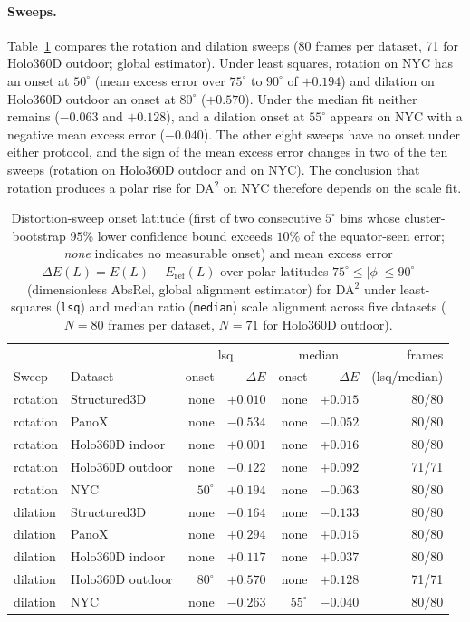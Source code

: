 \documentclass{article}
\newcommand{\absrel}{AbsRel}
\begin{document}
\paragraph{Sweeps.} Table~\ref{tab:da2sweep} compares the rotation and dilation sweeps (80 frames per dataset, 71 for Holo360D outdoor; global estimator). Under least squares, rotation on NYC has an onset at $50^\circ$ (mean excess error over $75^\circ$ to $90^\circ$ of $+0.194$) and dilation on Holo360D outdoor an onset at $80^\circ$ ($+0.570$). Under the median fit neither remains ($-0.063$ and $+0.128$), and a dilation onset at $55^\circ$ appears on NYC with a negative mean excess error ($-0.040$). The other eight sweeps have no onset under either protocol, and the sign of the mean excess error changes in two of the ten sweeps (rotation on Holo360D outdoor and on NYC). The conclusion that rotation produces a polar rise for DA$^2$ on NYC therefore depends on the scale fit.

\begin{table}[htbp]\centering\footnotesize
\caption{Distortion-sweep onset latitude (first of two consecutive $5^\circ$ bins whose cluster-bootstrap $95\%$ lower confidence bound exceeds $10\%$ of the equator-seen error; \emph{none} indicates no measurable onset) and mean excess error $\Delta E(L)=E(L)-E_{\mathrm{ref}}(L)$ over polar latitudes $75^\circ\le|\phi|\le90^\circ$ (dimensionless \absrel{}, global alignment estimator) for DA$^2$ under least-squares (\texttt{lsq}) and median ratio (\texttt{median}) scale alignment across five datasets ($N=80$ frames per dataset, $N=71$ for Holo360D outdoor).}\label{tab:da2sweep}
\begin{tabular}{llrrrrr}\toprule
 & & \multicolumn{2}{c}{lsq} & \multicolumn{2}{c}{median} & frames\\
Sweep & Dataset & onset & $\Delta E$ & onset & $\Delta E$ & (lsq/median)\\\midrule
rotation & Structured3D & none & $+0.010$ & none & $+0.015$ & 80/80\\
rotation & PanoX & none & $-0.534$ & none & $-0.052$ & 80/80\\
rotation & Holo360D indoor & none & $+0.001$ & none & $+0.016$ & 80/80\\
rotation & Holo360D outdoor & none & $-0.122$ & none & $+0.092$ & 71/71\\
rotation & NYC & $50^\circ$ & $+0.194$ & none & $-0.063$ & 80/80\\
dilation & Structured3D & none & $-0.164$ & none & $-0.133$ & 80/80\\
dilation & PanoX & none & $+0.294$ & none & $+0.015$ & 80/80\\
dilation & Holo360D indoor & none & $+0.117$ & none & $+0.037$ & 80/80\\
dilation & Holo360D outdoor & $80^\circ$ & $+0.570$ & none & $+0.128$ & 71/71\\
dilation & NYC & none & $-0.263$ & $55^\circ$ & $-0.040$ & 80/80\\
\bottomrule\end{tabular}
\end{table}
\end{document}
